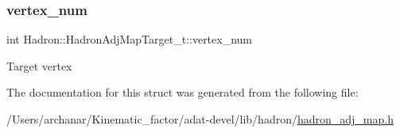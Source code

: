 \subsubsection{\texorpdfstring{vertex\_num}{vertex\_num}}
{\footnotesize\ttfamily int Hadron\+::\+Hadron\+Adj\+Map\+Target\+\_\+t\+::vertex\+\_\+num}

Target vertex 

The documentation for this struct was generated from the following file\+:\begin{DoxyCompactItemize}
\item 
/\+Users/archanar/\+Kinematic\+\_\+factor/adat-\/devel/lib/hadron/\mbox{\hyperlink{adat-devel_2lib_2hadron_2hadron__adj__map_8h}{hadron\+\_\+adj\+\_\+map.\+h}}\end{DoxyCompactItemize}
